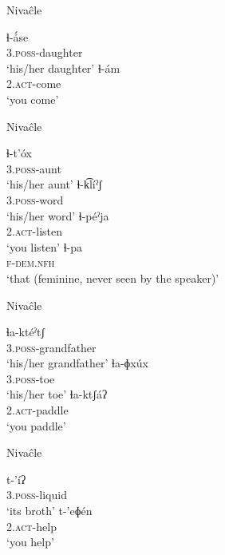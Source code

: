 \ea\label{ex:sylllh:1:niv}
    Nivaĉle \citep[59, 62]{AnG15}
    \begin{xlist}
        \ex\gll ɬ-ǻse \\
                3.{\textsc{poss}}-daughter \\
                \glt `his/her daughter'
        \ex\gll ɬ-ám \\
                2.{\textsc{act}}-come \\
                \glt `you come'
    \end{xlist}
\z

\ea\label{ex:sylllh:2:niv}
    Nivaĉle \citep[59, 62, 99, 231]{AnG15}
    \begin{xlist}
        \ex\gll ɬ-t’óx \\
                3.{\textsc{poss}}-aunt \\
                \glt `his/her aunt'
        \ex\gll ɬ-k͡líˀʃ \\
                3.{\textsc{poss}}-word \\
                \glt `his/her word'
        \ex\gll ɬ-péˀja \\
                2.{\textsc{act}}-listen \\
                \glt `you listen'
        \ex\gll ɬ-pa \\
                {\textsc{f}}-{\textsc{dem.nfh}} \\
                \glt `that (feminine, never seen by the speaker)'
    \end{xlist}
\z

\ea\label{ex:sylllh:3:niv}
    Nivaĉle \citep[59, 62, 231]{AnG15}
    \begin{xlist}
        \ex\gll ɬa-ktéˀtʃ \\
                3.{\textsc{poss}}-grandfather \\
                \glt `his/her grandfather'
        \ex\gll ɬa-ɸxúx \\
                3.{\textsc{poss}}-toe \\
                \glt `his/her toe'
        \ex\gll ɬa-ktʃáʔ \\
                2.{\textsc{act}}-paddle \\
                \glt `you paddle'
    \end{xlist}
\z

\ea\label{ex:sylllh:4:niv}
    Nivaĉle \citep[123]{AnG15,JS16}
    \begin{xlist}
        \ex\gll t-’íʔ \\
                3.{\textsc{poss}}-liquid \\
                \glt `its broth'
        \ex\gll t-’eɸén\\
                2.{\textsc{act}}-help\\
                \glt `you help'
    \end{xlist}
\z

